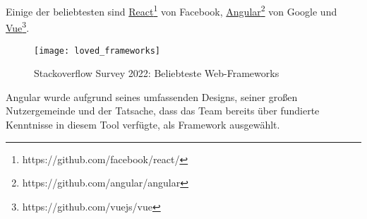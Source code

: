 Einige der beliebtesten sind \href{https://github.com/facebook/react/}{React}\footnote{https://github.com/facebook/react/} von Facebook,
\href{https://github.com/facebook/react/}{Angular}\footnote{https://github.com/angular/angular} von Google und
\href{https://github.com/facebook/react/}{Vue}\footnote{https://github.com/vuejs/vue}.

\begin{figure}[h]
  \centering
  \texttt{[image: loved\_frameworks]}
  \caption{Stackoverflow Survey 2022: Beliebteste Web-Frameworks}
  \label{fig:spa}
\end{figure}

Angular wurde aufgrund seines umfassenden Designs, seiner großen Nutzergemeinde und der Tatsache, dass das Team bereits über fundierte Kenntnisse in diesem Tool verfügte, als Framework ausgewählt.